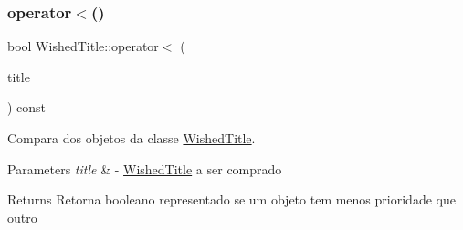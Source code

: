 \subsubsection{\texorpdfstring{operator$<$()}{operator<()}}
{\footnotesize\ttfamily bool Wished\+Title\+::operator$<$ (\begin{DoxyParamCaption}\item[{const \hyperlink{classWishedTitle}{Wished\+Title} \&}]{title }\end{DoxyParamCaption}) const}



Compara dos objetos da classe \hyperlink{classWishedTitle}{Wished\+Title}. 


\begin{DoxyParams}{Parameters}
{\em title} & -\/ \hyperlink{classWishedTitle}{Wished\+Title} a ser comprado \\
\hline
\end{DoxyParams}
\begin{DoxyReturn}{Returns}
Retorna booleano representado se um objeto tem menos prioridade que outro 
\end{DoxyReturn}

